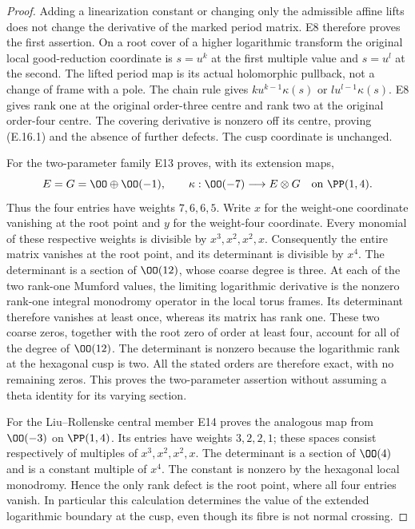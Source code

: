 \begin{proof}
Adding a linearization constant or changing only the admissible affine lifts does not change the derivative of the marked period matrix. E8 therefore proves the first assertion. On a root cover of a higher logarithmic transform the original local good-reduction coordinate is $s=u^k$ at the first multiple value and $s=u^l$ at the second. The lifted period map is its actual holomorphic pullback, not a change of frame with a pole. The chain rule gives $k u^{k-1}\kappa(s)$ or $l u^{l-1}\kappa(s)$. E8 gives rank one at the original order-three centre and rank two at the original order-four centre. The covering derivative is nonzero off its centre, proving (E.16.1) and the absence of further defects. The cusp coordinate is unchanged.

For the two-parameter family E13 proves, with its extension maps,
\[
 E=G=\OO\oplus\OO(-1),\qquad
 \kappa:\OO(-7)\longrightarrow E\otimes G
 \quad\text{on }\PP(1,4).
\]
Thus the four entries have weights $7,6,6,5$. Write $x$ for the weight-one coordinate vanishing at the root point and $y$ for the weight-four coordinate. Every monomial of these respective weights is divisible by $x^3,x^2,x^2,x$. Consequently the entire matrix vanishes at the root point, and its determinant is divisible by $x^4$. The determinant is a section of $\OO(12)$, whose coarse degree is three. At each of the two rank-one Mumford values, the limiting logarithmic derivative is the nonzero rank-one integral monodromy operator in the local torus frames. Its determinant therefore vanishes at least once, whereas its matrix has rank one. These two coarse zeros, together with the root zero of order at least four, account for all of the degree of $\OO(12)$. The determinant is nonzero because the logarithmic rank at the hexagonal cusp is two. All the stated orders are therefore exact, with no remaining zeros. This proves the two-parameter assertion without assuming a theta identity for its varying section.

For the Liu--Rollenske central member E14 proves the analogous map from $\OO(-3)$ on $\PP(1,4)$. Its entries have weights $3,2,2,1$; these spaces consist respectively of multiples of $x^3,x^2,x^2,x$. The determinant is a section of $\OO(4)$ and is a constant multiple of $x^4$. The constant is nonzero by the hexagonal local monodromy. Hence the only rank defect is the root point, where all four entries vanish. In particular this calculation determines the value of the extended logarithmic boundary at the cusp, even though its fibre is not normal crossing.


\end{proof}
